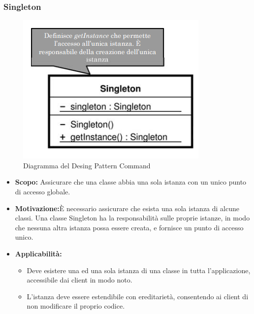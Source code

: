 \documentclass[a4paper]{article}
\begin{document}
	\subsubsection{Singleton}
				\begin{figure}[H]
					\centering
					\includegraphics[scale=0.65]{immagini/ST/Singleton.png}
					\caption{Diagramma del Desing Pattern Command}
				\end{figure}
		\begin{itemize}
			\item \textbf{Scopo:} Assicurare che una classe abbia una sola istanza con un unico punto di accesso globale.
			\item \textbf{Motivazione:}È necessario assicurare che esista una sola istanza di alcune classi. Una classe Singleton ha la responsabilità sulle proprie istanze, in modo che nessuna altra istanza possa essere creata, e fornisce un punto di accesso unico.
			\item \textbf{Applicabilità:}
			\begin{itemize}
				\item Deve esistere una ed una sola istanza di una classe in tutta l'applicazione, accessibile dai client in modo noto.
				\item L'istanza deve essere estendibile con ereditarietà, consentendo ai client di non modificare il proprio codice.
			\end{itemize}
		\end{itemize}
		
		
\end{document}

